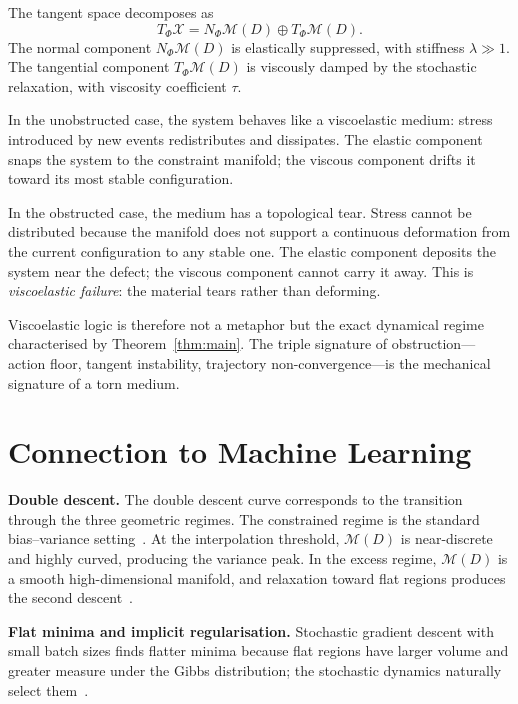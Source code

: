 \documentclass[12pt,oneside]{article}
\theoremstyle{plain}
\theoremstyle{definition}
\theoremstyle{remark}
\newcommand{\X}{\mathcal{X}}
\newcommand{\M}{\mathcal{M}}
\newcommand{\D}{D}
\begin{document}
The tangent space decomposes as
\[
  T_\Phi\X = N_\Phi\M(\D) \oplus T_\Phi\M(\D).
\]
The normal component $N_\Phi\M(\D)$ is elastically suppressed, with stiffness
$\lambda \gg 1$. The tangential component $T_\Phi\M(\D)$ is viscously damped by
the stochastic relaxation, with viscosity coefficient $\tau$.

In the unobstructed case, the system behaves like a viscoelastic medium: stress
introduced by new events redistributes and dissipates. The elastic component
snaps the system to the constraint manifold; the viscous component drifts it
toward its most stable configuration.

In the obstructed case, the medium has a topological tear. Stress cannot be
distributed because the manifold does not support a continuous deformation from
the current configuration to any stable one. The elastic component deposits the
system near the defect; the viscous component cannot carry it away. This is
\emph{viscoelastic failure}: the material tears rather than deforming.

Viscoelastic logic is therefore not a metaphor but the exact dynamical regime
characterised by Theorem~\ref{thm:main}. The triple signature of
obstruction---action floor, tangent instability, trajectory non-convergence---is
the mechanical signature of a torn medium.

\section{Connection to Machine Learning}
\label{sec:ml}

\noindent\textbf{Double descent.} The double descent curve corresponds to the
transition through the three geometric regimes. The constrained regime is the
standard bias--variance setting~\cite{Belkin2019}. At the interpolation
threshold, $\M(\D)$ is near-discrete and highly curved, producing the variance
peak. In the excess regime, $\M(\D)$ is a smooth high-dimensional manifold, and
relaxation toward flat regions produces the second descent~\cite{Zhang2017}.

\medskip\noindent\textbf{Flat minima and implicit regularisation.} Stochastic
gradient descent with small batch sizes finds flatter minima because flat regions
have larger volume and greater measure under the Gibbs distribution; the
stochastic dynamics naturally select them~\cite{Hochreiter1997,Keskar2017,Amari1998}.
\end{document}
